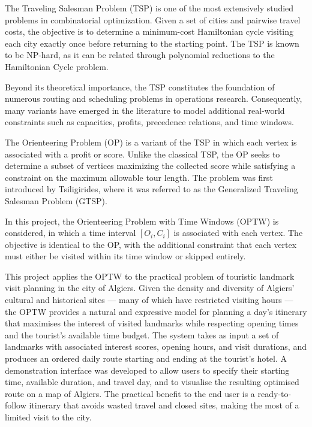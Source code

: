 The Traveling Salesman Problem (TSP) is one of the most extensively studied problems in combinatorial optimization. Given a set of cities and pairwise travel costs, the objective is to determine a minimum-cost Hamiltonian cycle visiting each city exactly once before returning to the starting point. The TSP is known to be NP-hard, as it can be related through polynomial reductions to the Hamiltonian Cycle problem.

Beyond its theoretical importance, the TSP constitutes the foundation of numerous routing and scheduling problems in operations research. Consequently, many variants have emerged in the literature to model additional real-world constraints such as capacities, profits, precedence relations, and time windows.

The Orienteering Problem (OP) is a variant of the TSP in which each vertex is associated with a profit or score. Unlike the classical TSP, the OP seeks to determine a subset of vertices maximizing the collected score while satisfying a constraint on the maximum allowable tour length. The problem was first introduced by Tsiligirides, where it was referred to as the Generalized Traveling Salesman Problem (GTSP).

In this project, the Orienteering Problem with Time Windows (OPTW) is considered, in which a time interval $[O_i, C_i]$ is associated with each vertex. The objective is identical to the OP, with the additional constraint that each vertex must either be visited within its time window or skipped entirely.

This project applies the OPTW to the practical problem of touristic landmark visit planning in the city of Algiers. Given the density and diversity of Algiers' cultural and historical sites --- many of which have restricted visiting hours --- the OPTW provides a natural and expressive model for planning a day's itinerary that maximises the interest of visited landmarks while respecting opening times and the tourist's available time budget. The system takes as input a set of landmarks with associated interest scores, opening hours, and visit durations, and produces an ordered daily route starting and ending at the tourist's hotel. A demonstration interface was developed to allow users to specify their starting time, available duration, and travel day, and to visualise the resulting optimised route on a map of Algiers. The practical benefit to the end user is a ready-to-follow itinerary that avoids wasted travel and closed sites, making the most of a limited visit to the city.